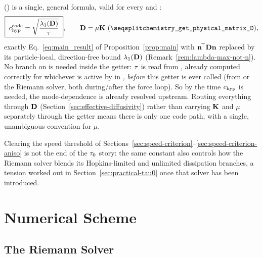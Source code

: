 () is a single, general
formula, valid for every  and
:
\begin{equation}
  \label{eq:code_constant}
  \boxed{\;\chyp^{\rm code} = \sqrt{\frac{\lambda_1(\Deff)}{\taurelax}}\;} ,
  \qquad \Deff=\mu\Kmat\ \text{(\code{chemistry\_get\_physical\_matrix\_D})} ,
\end{equation}
exactly Eq.~\eqref{eq:main_result} of Proposition~\ref{prop:main} with
$\mathbf{n}^{\!\top}\mathbf{D}\mathbf{n}$ replaced by its particle-local, direction-free
bound $\lambda_1(\mathbf{D})$ (Remark~\ref{rem:lambda-max-not-n}). No branch on
 is needed inside the getter: $\tau$ is
read from , already computed correctly for
whichever  is active by
 in
, \emph{before} this getter is ever
called (from  or the Riemann solver, both
during/after the force loop). So by the time $c_{\rm hyp}$ is needed, the
mode-dependence is already resolved upstream. Routing everything through
$\mathbf{D}$ (Section~\ref{sec:effective-diffusivity}) rather than carrying
$\mathbf{K}$ and $\mu$ separately through the getter means there is only one
code path, with a single, unambiguous convention for $\mu$.

Clearing the speed threshold of
Sections~\ref{sec:speed-criterion}--\ref{sec:speed-criterion-aniso} is
not the end of the $\tau_0$ story: the same constant also controls
how the Riemann solver blends its Hopkins-limited and unlimited
dissipation branches, a tension worked out in
Section~\ref{sec:practical-tau0} once that solver has been introduced.

\section{Numerical Scheme}

\subsection{The Riemann Solver}
\label{sec:hyperbolic-riemann-solver}

